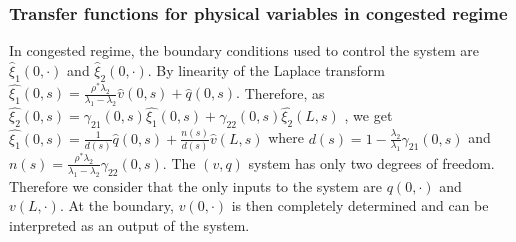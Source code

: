 \documentclass[a4paper, 10pt, conference]{ieeeconf}      %
\begin{document}
\subsubsection{Transfer functions for physical variables in congested regime}
In congested regime, the boundary conditions used to control the system are $\hat{\xi}_{1}\left(0,\cdot\right)$ and $\hat{\xi}_{2}\left(0,\cdot\right)$. By linearity of the Laplace transform
{\footnotesize
$\hat{\xi_{1}}\left(0,s\right) = 
\frac{
	\rho^{*}\lambda_{2}
}{
	\lambda_{1} - \lambda_{2}
} 
\hat{v}\left(0,s\right)
+
\hat{q}\left(0,s\right)
$.}
Therefore, as
{\footnotesize
$\hat{\xi_{2}}\left(0,s\right) =
\gamma_{21}\left(0,s\right)
\hat{\xi_{1}}\left(0,s\right)
+
\gamma_{22}\left(0,s\right)
\hat{\xi_{2}}\left(L,s\right)$}
, we get
{\footnotesize
$\hat{\xi_{1}}\left(0,s\right) =
\frac{1}{d\left(s\right)}
\hat{q}\left(0,s\right)
+
\frac{n\left(s\right)}{d\left(s\right)}
\hat{v}\left(L,s\right)
$}
where
{\footnotesize
$d\left(s\right) = 1 - \frac{\lambda_{2}}{\lambda_{1}}\gamma_{21}\left(0,s\right)$}
and
{\footnotesize$n\left(s\right) = \frac{\rho^{*} \lambda_{2}}{\lambda_{1} - \lambda_{2}} \gamma_{22}\left(0,s\right)$}. The $\left(v,q\right)$ system has only two degrees of freedom. Therefore we consider that the only inputs to the system are $q\left(0,\cdot\right)$ and $v\left(L,\cdot\right)$. At the boundary, $v\left(0,\cdot\right)$ is then completely determined and can be interpreted as an output of the system. 
\end{document}
